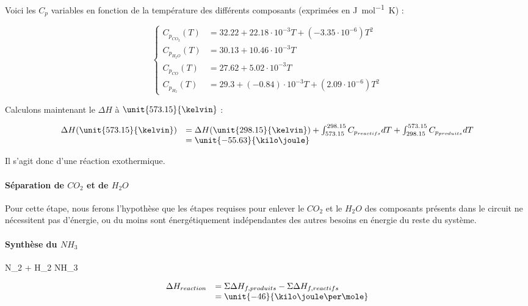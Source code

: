 Voici les $C_p$ variables en fonction de la température des différents composants \cite{hc-table}
(exprimées en \unit{\joule\per\mole\kelvin}) :

$$
	\left\{
		\begin{array}{rl}
			C_{p_{CO_{2}}}(T) &= 32.22 + 22.18\cdot10^{-3}T + (-3.35\cdot10^{-6})T^2\\
			C_{p_{H_2O}}(T)		&= 30.13 + 10.46\cdot10^{-3}T \\
			C_{p_{CO}}(T) 		&= 27.62 + 5.02\cdot10^{-3}T \\
			C_{p_{H_2}}(T) 		&= 29.3 + (-0.84)\cdot10^{-3}T + (2.09\cdot10^{-6})T^2
		\end{array}
	\right.
$$
					
Calculons maintenant le $\Delta H$ à $\unit{573.15}{\kelvin}$ :			

$$
	\begin{array}{rl}
		 	 \Delta H(\unit{573.15}{\kelvin})	&=  \Delta H(\unit{298.15}{\kelvin}) 
				+ \int_{573.15}^{298.15} C_{p_{reactifs}} dT + \int_{298.15}^{573.15} C_{p_{produits}} dT \\
				&=  \unit{-55.63}{\kilo\joule}
	\end{array}
$$	
	
Il s'agit donc d'une réaction exothermique.

\paragraph{Séparation de $CO_{2}$ et de $H_{2}O$}		
Pour cette étape, nous ferons l'hypothèse que les étapes requises pour enlever le $CO_{2}$ et le $H_{2}O$ 
des composants présents dans le circuit ne nécessitent pas d'énergie, ou du moins sont énergétiquement indépendantes 
des autres besoins en énergie du reste du système.

\paragraph{Synthèse du $NH_{3}$} 
\begin{chemmath}
		N_{2} + H_2 \Longrightarrow NH_3 
\end{chemmath}	

$$
	\begin{array}{rl}
	\Delta H_{reaction}		&= \Sigma \Delta H_{f,produits} - \Sigma \Delta H_{f,reactifs} \\
												&= \unit{-46}{\kilo\joule\per\mole}
	\end{array}
$$

